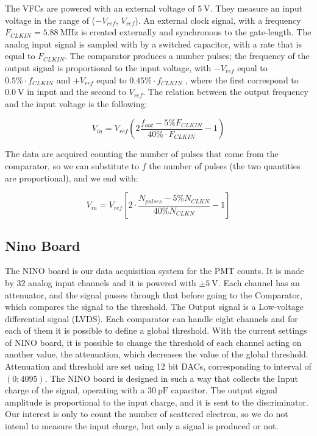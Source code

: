 The VFCs are powered with an external voltage of $\SI{5}{\volt}$. They measure an input voltage in the range of ($-V_{ref}$, $V_{ref}$). An external clock signal, with a frequency $F_{CLKIN} = \SI{5.88}{\mega \hertz}$ is created externally and synchronous to the gate-length.
The analog input signal is sampled with by a switched capacitor, with a rate that is equal to $F_{CLKIN}$.
The comparator produces a number pulses; the frequency of the output signal is proportional to the input voltage, with $-V_{ref}$ equal to $0.5 \% \cdot f_{CLKIN}$ and $+V_{ref}$ equal to $0.45 \% \cdot f_{CLKIN}$ \cite{VfcDatasheet}, where the first correspond to $\SI{0.0}{ \volt}$ in input and the second to $V_{ref}$. The relation between the output frequency and the input voltage is the following:

\begin{equation}
V_{in} = V_{ref} (2 \frac{f_{out} - 5\% F_{CLKIN}}{40 \% \cdot F_{CLKIN}} -1)
\end{equation}

The data are acquired counting the number of pulses that come from the comparator, so we can substitute to $f$ the number of pulses (the two quantities are proportional), and we end with:

\begin{equation} \label{eq:Vfc}
V_{in} =  V_{ref}[2 \cdot \dfrac{N_{pulses} - 5 \% N_{CLKN}}{40 \% N_{CLKN}} - 1]
\end{equation}

\subsection{Nino Board} \label{NINO}

The NINO board is our data acquisition system for the PMT counts. It is made by $32$ analog input channels and it is powered with $\pm \SI{5}{\volt}$. Each channel has an attenuator, and the signal passes through that before going to the Comparator, which compares the signal to the threshold. The Output signal is a Low-voltage differential signal (LVDS). Each comparator can handle eight channels and for each of them it is possible to define a global threshold. With the current settings of NINO board, it is possible to change the threshold of each channel acting on another value, the attenuation, which decreases the value of the global threshold. Attenuation and threshold are set using 12 bit DACs, corresponding to interval of $(0 ; 4095)$. \medskip
The NINO board is designed in such a way that collects the Input charge of the signal, operating with a $\SI{30}{\pico \farad}$ capacitor. The output signal amplitude is proportional to the input charge, and it is sent to the discriminator. Our interest is only to count the number of scattered electron, so we do not intend to measure the input charge, but only a signal is produced or not.

